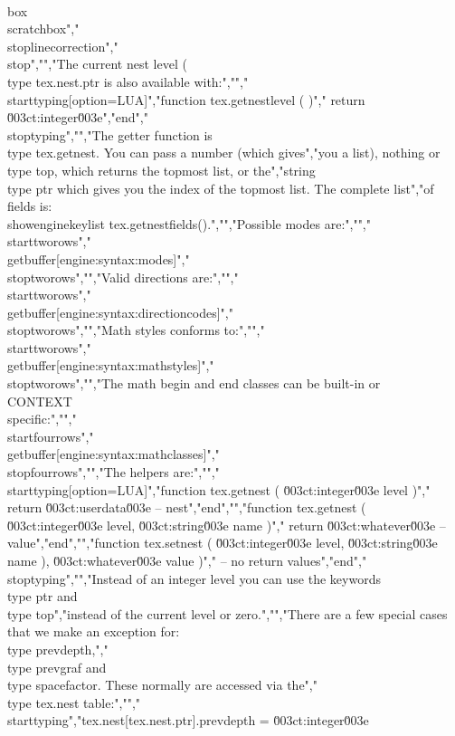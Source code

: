 \\box\\scratchbox","\\stoplinecorrection","\\stop","","The current nest level (\\type {tex.nest.ptr} is also available with:","","\\starttyping[option=LUA]","function tex.getnestlevel ( )","    return \u003ct:integer\u003e","end","\\stoptyping","","The getter function is \\type {tex.getnest}. You can pass a number (which gives","you a list), nothing or \\type {top}, which returns the topmost list, or the","string \\type {ptr} which gives you the index of the topmost list. The complete list","of fields is: \\showenginekeylist {tex.getnestfields()}.","","Possible modes are:","","\\starttworows","\\getbuffer[engine:syntax:modes]","\\stoptworows","","Valid directions are:","","\\starttworows","\\getbuffer[engine:syntax:directioncodes]","\\stoptworows","","Math styles conforms to:","","\\starttworows","\\getbuffer[engine:syntax:mathstyles]","\\stoptworows","","The math begin and end classes can be built-in or \\CONTEXT\\ specific:","","\\startfourrows","\\getbuffer[engine:syntax:mathclasses]","\\stopfourrows","","The helpers are:","","\\starttyping[option=LUA]","function tex.getnest ( \u003ct:integer\u003e level )","    return \u003ct:userdata\u003e -- nest","end","","function tex.getnest ( \u003ct:integer\u003e level, \u003ct:string\u003e name )","    return \u003ct:whatever\u003e -- value","end","","function tex.setnest ( \u003ct:integer\u003e level, \u003ct:string\u003e name ), \u003ct:whatever\u003e value )","    -- no return values","end","\\stoptyping","","Instead of an integer level you can use the keywords \\type {ptr} and \\type {top}","instead of the current level or zero.","","There are a few special cases that we make an exception for: \\type {prevdepth},","\\type {prevgraf} and \\type {spacefactor}. These normally are accessed via the","\\type {tex.nest} table:","","\\starttyping","tex.nest[tex.nest.ptr].prevdepth   = \u003ct:integer\u003e 
